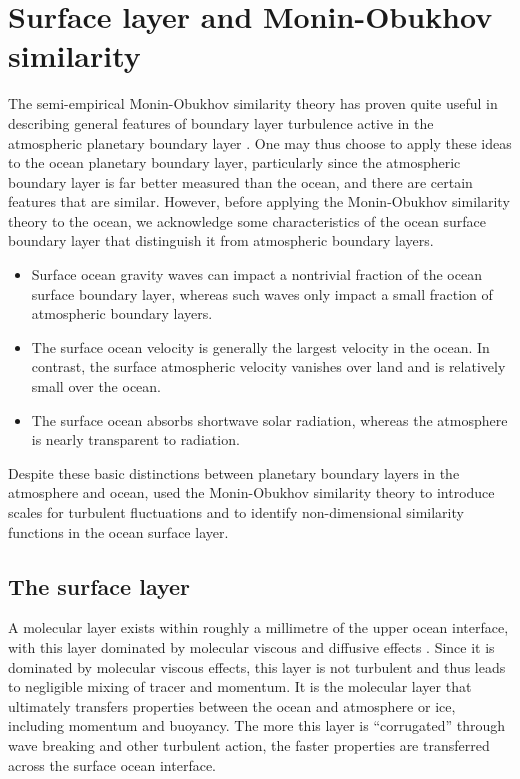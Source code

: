 \section{Surface layer and Monin-Obukhov similarity}
\label{section:m-o-similarity}

The semi-empirical Monin-Obukhov similarity theory has proven quite
useful in describing general features of boundary layer turbulence
active in the atmospheric planetary boundary layer \citep[see, e.g.,
Section 3.3 of][]{KanthaClaysonII}. One may thus choose to apply these
ideas to the ocean planetary boundary layer, particularly since the
atmospheric boundary layer is far better measured than the ocean, and
there are certain features that are similar. However, before applying
the Monin-Obukhov similarity theory to the ocean, we acknowledge some
characteristics of the ocean surface boundary layer that distinguish
it from atmospheric boundary layers.

\begin{itemize}

\item Surface ocean gravity waves can impact a nontrivial fraction of
  the ocean surface boundary layer, whereas such waves only impact a
  small fraction of atmospheric boundary layers.

\item The surface ocean velocity is generally the largest velocity in
  the ocean. In contrast, the surface atmospheric velocity vanishes
  over land and is relatively small over the ocean.

\item The surface ocean absorbs shortwave solar radiation, whereas the
  atmosphere is nearly transparent to radiation.

\end{itemize}
Despite these basic distinctions between planetary boundary layers in
the atmosphere and ocean, \cite{LargeKPP} used the Monin-Obukhov
similarity theory to introduce scales for turbulent fluctuations and
to identify non-dimensional similarity functions in the ocean surface
layer.


\subsection{The surface layer}
\label{subsection:surface-layer}


A molecular layer exists within roughly a millimetre of the upper
ocean interface, with this layer dominated by molecular viscous and
diffusive effects \citep{LargeKPP_lectures,Large2012}.  Since it is
dominated by molecular viscous effects, this layer is not turbulent
and thus leads to negligible mixing of tracer and momentum.  It is the
molecular layer that ultimately transfers properties between the ocean
and atmosphere or ice, including momentum and buoyancy.  The more this
layer is ``corrugated'' through wave breaking and other turbulent
action, the faster properties are transferred across the surface ocean
interface.

